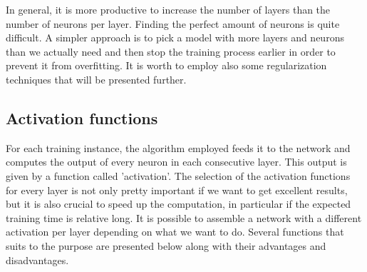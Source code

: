 In general, it is more productive to increase the number of layers than the number of neurons per layer. Finding the perfect amount of neurons is quite difficult. A simpler approach is to pick a model with more layers and neurons than we actually need and then stop the training process earlier in order to prevent it from overfitting. It is worth to employ also some regularization techniques that will be presented further.







\subsection{Activation functions}
For each training instance, the algorithm employed feeds it to the network and computes the output of every neuron in each consecutive layer. This output is given by a function called 'activation'. The selection of the activation functions for every layer is not only pretty important if we want to get excellent results, but it is also crucial to speed up the computation, in particular if the expected training time is relative long. It is possible to assemble a network with a different activation per layer depending on what we want to do. Several functions that suits to the purpose are presented below along with their advantages and disadvantages.

